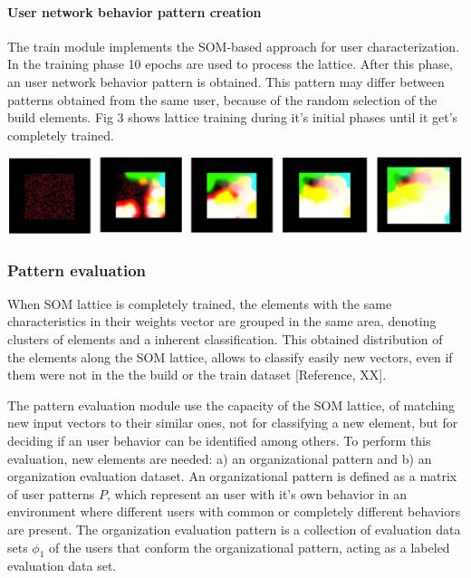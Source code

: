 \documentclass{article}
\begin{document}
\paragraph{User network behavior pattern creation} %
The train module implements the SOM-based approach for user characterization. In the training phase 10 epochs are used to process the lattice. After this phase, an user network behavior pattern is obtained. This pattern may differ between patterns obtained from the same user, because of the random selection of the build elements. Fig 3 shows lattice training during it's initial phases until it get's completely trained.

\begin{center}\includegraphics[scale=0.2]{fig-training} \end{center}





\subsubsection{Pattern evaluation} %
When SOM lattice is completely trained, the elements with the same characteristics in their weights vector are grouped in the same area, denoting clusters of elements and a inherent classification. This obtained distribution of the elements along the SOM lattice, allows to classify easily new vectors, even if them were not in the the build or the train dataset [Reference, XX].

The pattern evaluation module use the capacity of the SOM lattice, of matching new input vectors to their similar ones, not for classifying a new element, but for deciding if an user behavior can be identified among others. To perform this evaluation, new elements are needed: a) an organizational pattern and b) an organization evaluation dataset. An organizational pattern is defined as a matrix of user patterns $P$, which represent an user with it's own behavior in an environment where different users with common or completely different behaviors are present. The organization evaluation pattern is a collection of evaluation data sets $\phi_1$ of the users that conform the organizational pattern, acting as a labeled evaluation data set.
\end{document}
